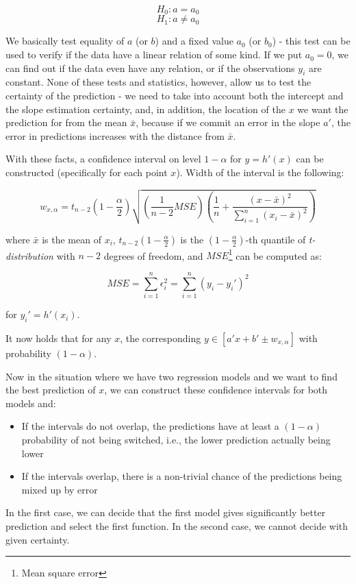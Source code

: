 \[H_0: a = a_0\]
\[H_1: a \neq a_0 \]

We basically test equality of $a$ (or $b$) and a fixed value $a_0$ (or $b_0$) - this test can be used to verify if the data have a linear relation of some kind. If we put $a_0 = 0$, we can find out if the data even have any relation, or if the observations $y_i$ are constant. None of these tests and statistics, however, allow us to test the certainty of the prediction - we need to take into account both the intercept and the slope estimation certainty, and, in addition, the location of the $x$ we want the prediction for from the mean $\bar{x}$, because if we commit an error in the slope $a'$, the error in predictions increases with the distance from $\bar{x}$. 

With these facts, a confidence interval on level $1 - \alpha$ for $y = h'(x)$ can be constructed (specifically for each point $x$). Width of the interval is the following:

\[
w_{x, \alpha} = t_{n - 2}(1-\frac{\alpha}{2}) \sqrt{(\frac{1}{n - 2} MSE) (\frac{1}{n} + \frac{(x - \bar{x})^2}{ \sum_{i = 1}^{n} (x_i - \bar{x})^2 })}
\]

where \(\bar{x}\) is the mean of \(x_i\), $t_{n - 2}(1-\frac{\alpha}{2})$ is the $(1-\frac{\alpha}{2})$-th quantile of \textit{t-distribution} with $n-2$ degrees of freedom, and $MSE$\footnote{Mean square error} can be computed as:

\[MSE =  \sum_{i = 1}^{n} \epsilon_i^2  =  \sum_{i = 1}^{n} (y_i - y_i')^2 \]

for \(y_i' = h'(x_i)\).

It now holds that for any $x$, the corresponding $y \in [a'x + b' \pm w_{x, \alpha}]$ with probability $(1-\alpha)$.

Now in the situation where we have two regression models and we want to find the best prediction of $x$, we can construct these confidence intervals for both models and:

\begin{itemize}
	\item If the intervals do not overlap, the predictions have at least a $(1 - \alpha)$ probability of not being switched, i.e., the lower prediction actually being lower
	\item If the intervals overlap, there is a non-trivial chance of the predictions being mixed up by error
\end{itemize}

In the first case, we can decide that the first model gives significantly better prediction and select the first function. In the second case, we cannot decide with given certainty.


